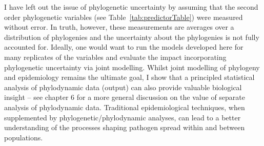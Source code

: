 I have left out the issue of phylogenetic uncertainty by assuming that the second order phylogenetic variables (see Table~\ref{tab:predictorTable}) were measured without error.
In truth, however, these measurements are averages over a distribution of phylogenies and the uncertainty about the phylogenies is not fully accounted for.
Ideally, one would want to run the models developed here for many replicates of the variables and evaluate the impact incorporating phylogenetic uncertainty via joint modelling.
Whilst joint modelling of phylogeny and epidemiology remains the ultimate goal, I show that a principled statistical analysis of phylodynamic data (output) can also provide valuable biological insight -- see chapter 6 for a more general discussion on the value of separate analysis of phylodynamic data.
Traditional epidemiological techniques, when supplemented by phylogenetic/phylodynamic analyses, can lead to a better understanding of the processes shaping pathogen spread within and between populations.

